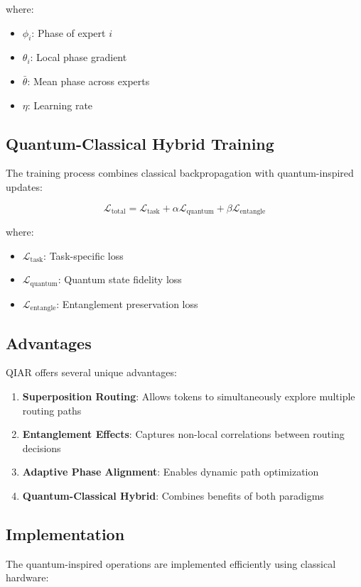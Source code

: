\documentclass[10pt,journal,compsoc]{IEEEtran}
\begin{document}
where:
\begin{itemize}
    \item $\phi_i$: Phase of expert $i$
    \item $\theta_i$: Local phase gradient
    \item $\bar{\theta}$: Mean phase across experts
    \item $\eta$: Learning rate
\end{itemize}

\subsection{Quantum-Classical Hybrid Training}
The training process combines classical backpropagation with quantum-inspired updates:

\begin{equation}
    \mathcal{L}_{\text{total}} = \mathcal{L}_{\text{task}} + \alpha\mathcal{L}_{\text{quantum}} + \beta\mathcal{L}_{\text{entangle}}
\end{equation}

where:
\begin{itemize}
    \item $\mathcal{L}_{\text{task}}$: Task-specific loss
    \item $\mathcal{L}_{\text{quantum}}$: Quantum state fidelity loss
    \item $\mathcal{L}_{\text{entangle}}$: Entanglement preservation loss
\end{itemize}

\subsection{Advantages}
QIAR offers several unique advantages:

\begin{enumerate}
    \item \textbf{Superposition Routing}: Allows tokens to simultaneously explore multiple routing paths
    \item \textbf{Entanglement Effects}: Captures non-local correlations between routing decisions
    \item \textbf{Adaptive Phase Alignment}: Enables dynamic path optimization
    \item \textbf{Quantum-Classical Hybrid}: Combines benefits of both paradigms
\end{enumerate}

\subsection{Implementation}
The quantum-inspired operations are implemented efficiently using classical hardware:
\end{document}

